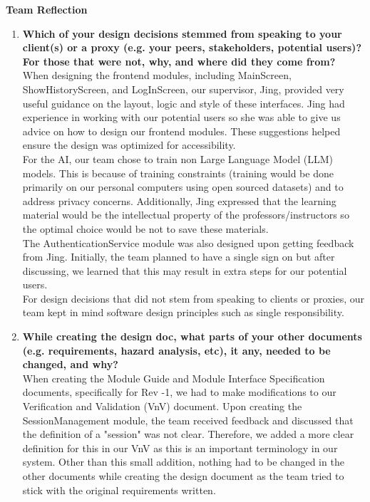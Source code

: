 \documentclass[12pt, titlepage]{article}
\begin{document}
\textbf{Team Reflection}
\begin{enumerate}

  \item \textbf{Which of your design decisions stemmed from speaking to your client(s)
  or a proxy (e.g. your peers, stakeholders, potential users)? For those that
  were not, why, and where did they come from?} \\
  When designing the frontend modules, including MainScreen, ShowHistoryScreen, and 
  LogInScreen, our supervisor, Jing, provided very useful guidance on the layout, logic and 
  style of these interfaces. Jing had experience in working with our potential users so 
  she was able to give us advice on how to design our frontend modules. These suggestions 
  helped ensure the design was optimized for accessibility. \\
  For the AI, our team chose 
  to train non Large Language Model (LLM) models. This is because of training constraints 
  (training would be done primarily on our personal computers using open sourced datasets)
  and to address privacy concerns. Additionally, Jing expressed that the learning material 
  would be the intellectual property of the professors/instructors so the optimal choice 
  would be not to save these materials. \\
  The AuthenticationService module was also designed upon getting feedback from Jing. 
  Initially, the team planned to have a single sign on but after discussing, we learned that 
  this may result in extra steps for our potential users. \\
  For design decisions that did not stem from speaking to clients or proxies, our team 
  kept in mind software design principles such as single responsibility. 

  \item \textbf{While creating the design doc, what parts of your other documents (e.g.
  requirements, hazard analysis, etc), it any, needed to be changed, and why?}\\
  When creating the Module Guide and Module Interface Specification documents, specifically for 
  Rev -1, we had to make modifications to our Verification and Validation (VnV) document. Upon 
  creating the SessionManagement module, the team received feedback and discussed that the 
  definition of a "session" was not clear. Therefore, we added a more clear definition for this in 
  our VnV as this is an important terminology in our system. Other than this small addition, 
  nothing had to be changed in the other documents while creating the design document as the team 
  tried to stick with the original requirements written. 



\end{enumerate}
\end{document}
